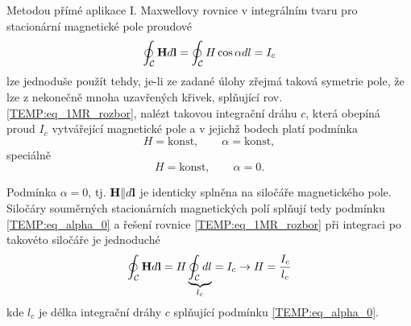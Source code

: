 {    Metodou přímé aplikace I. Maxwellovy rovnice v integrálním tvaru pro stacionární magnetické
    pole proudové
      \begin{equation}\label{TEMP:eq_1MR_rozbor}
        \oint_\mathcal{C}\mathbf{H}d\mathbf{l} = \oint_\mathcal{C}H\cos\alpha dl = I_c
      \end{equation}    
    lze jednoduše použít tehdy, je-li ze zadané úlohy zřejmá taková symetrie pole, že lze z 
    nekonečně mnoha uzavřených křivek, splňující rov. \ref{TEMP:eq_1MR_rozbor}, nalézt takovou 
    integrační dráhu $c$, která obepíná proud $I_c$ vytvářející magnetické pole a v jejichž bodech 
    platí podmínka
      \begin{equation}\label{TEMP:eq_H_alpha_konst}
        H = \text{konst}, \qquad \alpha = \text{konst},
      \end{equation}    
    speciálně
      \begin{equation}\label{TEMP:eq_alpha_0}
        H = \text{konst}, \qquad \alpha = 0.
      \end{equation}
    
    Podmínka $\alpha = 0$, tj. $\mathbf{H}\| d\mathbf{l}$ je identicky splněna na siločáře magnetického 
    pole. Siločáry souměrných stacionárních magnetických polí splňují tedy podmínku 
    \ref{TEMP:eq_alpha_0} a řešení rovnice \ref{TEMP:eq_1MR_rozbor} při integraci po takovéto 
    siločáře je jednoduché
      \begin{equation}\label{TEMP:eq_1MR_alpha0}
        \oint_\mathcal{C}\mathbf{H}d\mathbf{l} = H\underbrace{\oint_\mathcal{C} dl}_{l_c} = 
                                         I_c \rightarrow H = \frac{I_c}{l_c}
      \end{equation}            
    kde $l_c$ je délka integrační dráhy $c$ splňující podmínku \ref{TEMP:eq_alpha_0}.
      
}
